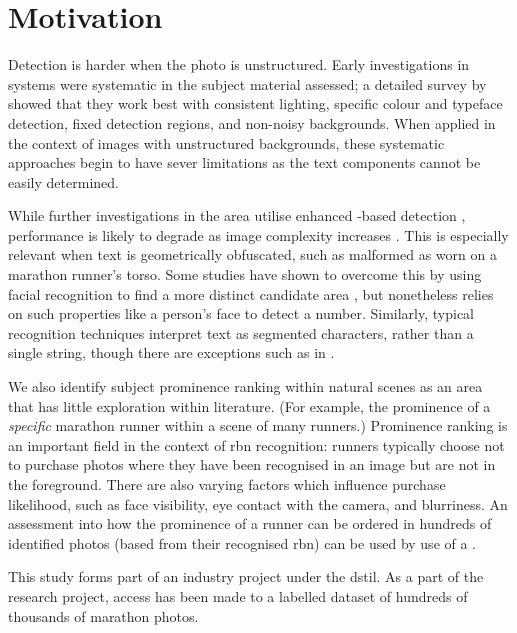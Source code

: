 \section{Motivation}
\label{sec:introduction:motivation}

Detection is harder when the photo is unstructured. Early investigations in  systems were systematic in the subject material assessed; a detailed survey by \cite{Anagnostopoulos:2008vu} showed that they work best  with consistent lighting, specific colour and typeface detection, fixed detection regions, and non-noisy backgrounds. When applied in the context of images with unstructured backgrounds, these systematic approaches begin to have sever limitations as the text components cannot be easily determined.

While further investigations in the area utilise enhanced -based detection \citep{Chen:2011ul,Shivakumara:2011dn,Epshtein:2010tj}, performance is likely to degrade as image complexity increases \citep{Li:2012wd}. This is especially relevant when text is geometrically obfuscated, such as malformed  as worn on a marathon runner's torso. Some studies have shown to overcome this by using facial recognition to find a more distinct candidate area \citep{Benami:2012jf}, but nonetheless relies on such properties like a person's face to detect a number. Similarly, typical recognition techniques interpret text as segmented characters, rather than a single string, though there are exceptions such as in \citet{Zhu:2016ut}.

We also identify subject prominence ranking within natural scenes as an area that has little exploration within literature. (For example, the prominence of a \textit{specific} marathon runner within a scene of many runners.) Prominence ranking is an important field in the context of \gls{rbn} recognition: runners typically choose not to purchase photos where they have been recognised in an image but are not in the foreground. There are also varying factors which influence purchase likelihood, such as face visibility, eye contact with the camera, and blurriness. An assessment into how the prominence of a runner can be ordered in hundreds of identified photos (based from their recognised \gls{rbn}) can be used by use of a .

This study forms part of an industry project under the \gls{dstil}. As a part of the research project, access has been made to a labelled dataset of hundreds of thousands of marathon photos.

